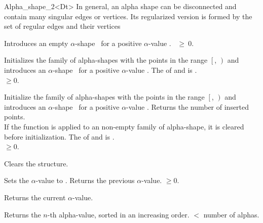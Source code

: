 \begin{ccRefClass} {Alpha_shape_2<Dt>}
{ In general, an alpha shape can be disconnected and contain many singular edges 
or vertices. Its regularized version is formed by the set of regular edges
and their vertices}

\ccCreation
{}

{Introduces an empty $\alpha$-shape \ccVar\ for a positive $\alpha$-value
 .
\ccPrecond {}~$\geq~0$.}


{Initializes the family of alpha-shapes with the points in the range
$\left[\right.$, $\left.\right)$ and 
introduces an $\alpha$-shape \ccVar\ for a positive $\alpha$-value
.  
\ccPrecond The  of  and
 is .\\
 $\geq 0$.}

\ccOperations

{Initialize the family of alpha-shapes with the points in the range
$\left[\right.$, $\left.\right)$ and 
introduces an $\alpha$-shape \ccVar\ for a positive $\alpha$-value
. Returns the number of inserted points. \\
If the function is applied to an non-empty family of alpha-shape, it is cleared
before initialization.
\ccPrecond The  of  and
 is .\\
 $\geq 0$.}

{Clears the structure.}

{Sets the $\alpha$-value to .
 Returns the previous $\alpha$-value.
\ccPrecond {} $\geq 0$.}

{Returns the current $\alpha$-value.}

{Returns the $n$-th alpha-value, sorted in an increasing order.
 \ccPrecond {} $<$ number of alphas.}


\end{ccRefClass}
